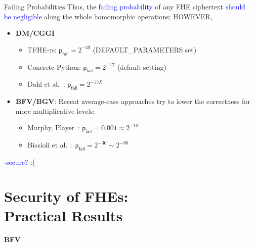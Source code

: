 \documentclass[handout]{beamer}
\begin{document}
	\begin{frame}{Failing Probabilities}
    Thus, the \textcolor{blue}{failing probability} of any FHE ciphertext \textcolor{blue}{should be negligible} along the whole homomorphic operations; HOWEVER,\vspace{0.3cm}\pause
    
    \begin{itemize}
        \item {\bf DM/CGGI}
            \begin{itemize}
                \item {TFHE-rs}: $\mathsf{p}_\mathsf{fail} =2^{-40}$ (DEFAULT\_PARAMETERS set)
                \item {{Concrete-Python}}: $\mathsf{p}_\mathsf{fail} =2^{-17}$ (default setting)
                \item {Dahl et al.~\cite{cryptoeprint:2023/815}}: $\mathsf{p}_\mathsf{fail} =2^{-13.9}$
            \end{itemize}\vspace{0.3cm}\pause
        \item {\bf BFV/BGV}: Recent average-case approaches try to lower the correctness for more multiplicative levels:
            \begin{itemize}
                \item {Murphy, Player~\cite{EPRINT:MurPla19a}}: $\mathsf{p}_\mathsf{fail} =0.001 \approx 2^{-10}$
                \item {Biasioli et al.~\cite{cryptoeprint:2023/600}}: $\mathsf{p}_\mathsf{fail} =2^{-36} \sim 2^{-80}$
            \end{itemize}
    \end{itemize}\vspace{0.3cm}\pause
    \begin{center}
        \textcolor{blue}{\indcpad-secure? :(}
    \end{center}
	\end{frame}

\section{\krd Security of FHEs:\\ {\normalsize Practical Results}}

    \begin{frame}{}
    \begin{center}
        {\Huge \bf BFV}
    \end{center} 
    \end{frame}    
    
\end{document}

